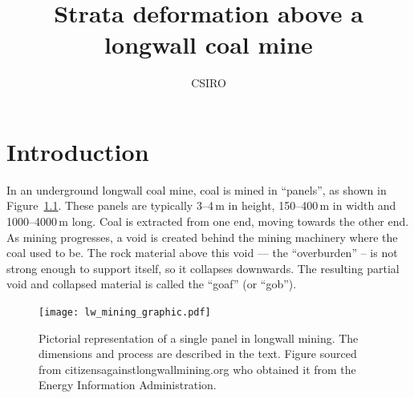 \documentclass[]{scrreprt}
\begin{document}
\title{Strata deformation above a longwall coal mine}
\author{CSIRO}
\maketitle

\tableofcontents

\chapter{Introduction}

In an underground longwall coal mine, coal is mined in ``panels'', as
shown in Figure~\ref{lw_mining_graphic.fig}.  These panels are typically 3--4\,m in
height, 150--400\,m in width and 1000--4000\,m long.  Coal is
extracted from one end, moving towards the other end.  As mining
progresses, a void is created behind the mining
machinery where the coal used to be.  The rock material above this
void --- the ``overburden'' -- is not strong enough to support itself,
so it collapses downwards.  The resulting partial void and collapsed
material is called the ``goaf'' (or ``gob'').

\begin{figure}[htb]
\begin{center}
\texttt{[image: lw\_mining\_graphic.pdf]}
\caption{Pictorial representation of a single panel in longwall
  mining.  The dimensions and process are described in the text.  Figure sourced from
  citizensagainstlongwallmining.org who obtained it from the Energy
  Information Administration.}
\label{lw_mining_graphic.fig}
\end{center}
\end{figure}
\end{document}
